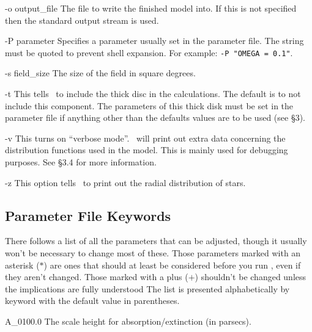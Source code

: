 \documentclass[11pt,twoside]{article}
\begin{document}
\begin{clo}{-o output\_file}
The file to write the finished model into. If this is not specified then
the standard output stream is used.
\end{clo}

\begin{clo}{-P parameter}
Specifies a parameter usually set in the parameter file. The string must be
quoted to prevent shell expansion. For example: {\tt -P "OMEGA = 0.1"}.
\end{clo}

\begin{clo}{-s field\_size}
The size of the field in square degrees.
\end{clo}

\begin{clo}{-t}
This tells \bsm\ to include the thick disc in the calculations. The default
is to not include this component. The parameters of this thick disk must be
set in the parameter file if anything other than the defaults values are to
be used (see \S3).
\end{clo}

\begin{clo}{-v}
This turns on ``verbose mode''. \bsm\ will print out extra data 
concerning the distribution functions used in the model. This is
mainly used for debugging purposes. See \S3.4 for more information.
\end{clo}

\begin{clo}{-z}
This option tells \bsm\ to print out the radial distribution
of stars.
\end{clo}

\subsection{Parameter File Keywords}
There follows a list of all the parameters that can be adjusted, though 
it usually won't be necessary to change most of these. Those parameters 
marked with an asterisk ($*$) are ones that should at least be considered
before you run \bsm, even if they aren't changed. Those marked with a plus 
($+$) shouldn't be changed unless the implications are fully understood
The list is presented alphabetically by keyword with the default value in 
parentheses.
\medskip

\begin{key}{A\_0}{100.0}{}
The scale height for absorption/extinction (in parsecs).
\end{key}
\end{document}
